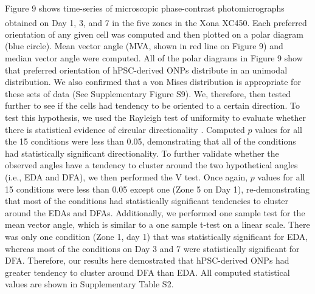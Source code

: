 \documentclass[review]{elsarticle}
\begin{document}
\indent Figure 9 shows time-series of microscopic phase-contrast photomicrographs obtained on Day 1, 3, and 7 in the five zones in the Xona\textsuperscript{\texttrademark} XC450. Each preferred orientation of any given cell was computed and then plotted on a polar diagram (blue circle). Mean vector angle (MVA, shown in red line on Figure 9) and median vector angle were computed. All of the polar diagrams in Figure 9 show that preferred orientation of hPSC-derived ONPs distribute in an unimodal distribution. We also confirmed that a von Mises distribution is appropriate for these sets of data (See Supplementary Figure S9). We, therefore, then tested further to see if the cells had tendency to be oriented to a certain direction. To test this hypothesis, we used the Rayleigh test of uniformity to evaluate whether there is statistical evidence of circular directionality \cite{Batschelet1981}. Computed $p$ values for all the 15 conditions were less than 0.05, demonstrating that all of the conditions had statistically significant directionality. To further validate whether the observed angles have a tendency to cluster around the two hypothetical angles (i.e., EDA and DFA), we then performed the V test. Once again, $p$ values for all 15 conditions were less than 0.05 except one (Zone 5 on Day 1), re-demonstrating that most of the conditions had statistically significant tendencies to cluster around the EDAs and DFAs. Additionally, we performed one sample test for the mean vector angle, which is similar to a one sample t-test on a linear scale. There was only one condition (Zone 1, day 1) that was statistically significant for EDA, whereas most of the conditions on Day 3 and 7 were statistically significant for DFA. Therefore, our results here demostrated that hPSC-derived ONPs had greater tendency to cluster around DFA than EDA. All computed statistical values are shown in Supplementary Table S2.
\end{document}
